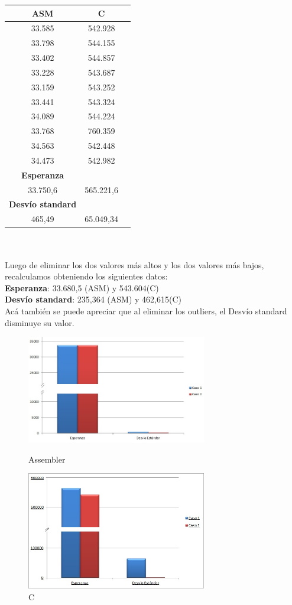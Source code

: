         \begin{tabular}[c]{|c|c|c|}
	\hline
		\textbf{ASM} & \textbf{C}\\
		\hline
33.585 &	542.928 \\
\hline
33.798 &	544.155 \\
\hline
33.402 &	544.857 \\
\hline
33.228 &	543.687 \\
\hline
33.159 &	543.252 \\
\hline
33.441 &	543.324 \\
\hline
34.089 &	544.224 \\ 
\hline
33.768 &	760.359 \\ 
\hline
34.563 &	542.448 \\
\hline
34.473 &	542.982 \\
\hline
		\textbf{Esperanza}	\\
		\hline
33.750,6 & 565.221,6	\\		
		\hline
		\textbf{Desvío standard}	\\
		\hline
465,49 & 65.049,34\\
		\hline
	\end{tabular}\\\\
	Luego de eliminar los dos valores m\'as altos y los dos valores m\'as bajos, recalculamos obteniendo los siguientes datos: \\
	\textbf{Esperanza}: 33.680,5 (ASM) y 543.604(C)\\
	\textbf{Desvío standard}:	235,364 (ASM) y 462,615(C)\\
	Ac\'a tambi\'en se puede apreciar que al eliminar los outliers, el Desvío standard disminuye su valor. \\
\newpage
\begin{figure}
  \begin{center}
	\includegraphics[width=0.7\textwidth]{imagenes/13/asm2.jpg}
	\caption{Assembler}
	\includegraphics[width=0.7\textwidth]{imagenes/13/C2.jpg}
	\caption{C}
  \end{center}
\end{figure}
